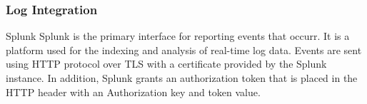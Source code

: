 \begin{frame}
\frametitle{Log Integration}
\begin{block}{Splunk}
Splunk is the primary interface for reporting events that occurr. It is a platform used for the indexing and analysis of real-time log data.
Events are sent using HTTP protocol over TLS with a certificate provided by the Splunk instance. In addition, Splunk grants an authorization token that is placed in the HTTP header with an Authorization key and token value.
 \end{block}
\end{frame}
